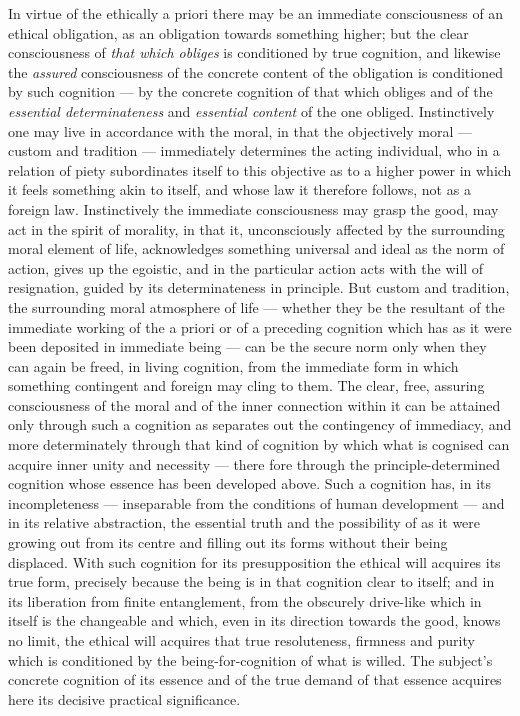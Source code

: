 \documentclass[12pt,a4paper]{book}
\begin{document}
In virtue of the ethically a priori there may be an immediate consciousness of
an ethical obligation, as an obligation towards something higher; but the
clear consciousness of \emph{that which obliges} is conditioned by true
cognition, and likewise the \emph{assured} consciousness of the concrete
content of the obligation is conditioned by such cognition --- by the concrete
cognition of that which obliges and of the \emph{essential determinateness}
and \emph{essential content} of the one obliged.
Instinctively one may live in accordance with the moral, in that the
objectively moral --- custom and tradition --- immediately determines the
acting individual, who in a relation of piety subordinates itself to this
objective as to a higher power in which it feels something akin to itself, and
whose law it therefore follows, not as a foreign law. Instinctively the
immediate consciousness may grasp the good, may act in the spirit of morality,
in that it, unconsciously affected by the surrounding moral element of life,
acknowledges something universal and ideal as the norm of action, gives up the
egoistic, and in the particular action acts with the will of resignation,
guided by its determinateness in principle. But custom and tradition, the
surrounding moral atmosphere of life --- whether they be the resultant of the
immediate working of the a priori or of a preceding cognition which has as it
were been deposited in immediate being --- can be the secure norm only when
they can again be freed, in living cognition, from the immediate form in which
something contingent and foreign may cling to them. The clear, free, assuring
consciousness of the moral and of the inner connection within it can be
attained only through such a cognition as separates out the contingency of
immediacy, and more determinately through that kind of cognition by which what
is cognised can acquire inner unity and necessity --- there\-%
fore through the principle-determined cognition whose essence has been
developed above. Such a cognition has, in its incompleteness --- inseparable
from the conditions of human development --- and in its relative abstraction,
the essential truth and the possibility of as it were growing out from its
centre and filling out its forms without their being displaced. With such
cognition for its presupposition the ethical will acquires its true form,
precisely because the being is in that cognition clear to itself; and in its
liberation from finite entanglement, from the obscurely drive-like which in
itself is the changeable and which, even in its direction towards the good,
knows no limit, the ethical will acquires that true resoluteness, firmness and
purity which is conditioned by the being-for-cognition of what is willed. The
subject's concrete cognition of its essence and of the true demand of that
essence acquires here its decisive practical significance.
\end{document}
